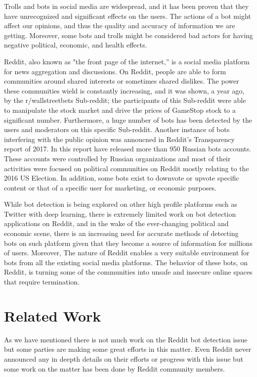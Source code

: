 \documentclass{article}
\begin{document}
Trolls and bots in social media are widespread, and it has been proven that they have unrecognized and significant effects on the users. The actions of a bot might affect our opinions, and thus the quality and accuracy of information we are getting. Moreover, some bots and trolls might be considered bad actors for having negative political, economic, and health effects. \par
Reddit, also known as "the front page of the internet,” is a social media platform for news aggregation and discussions. On Reddit, people are able to form communities around shared interests or sometimes shared dislikes. The power these communities wield is constantly increasing, and it was shown, a year ago, by the r/wallstreetbets Sub-reddit; the participants of this Sub-reddit were able to manipulate the stock market and drive the prices of GameStop stock to a significant number.  Furthermore,  a huge number of bots has been detected by the users and moderators on this specific Sub-reddit. Another instance of bots interfering with the public opinion was annoucned in Reddit's Transparency report of 2017.  In this report have released more than 950 Russian bots accounts. These accounts were controlled by Russian organizations and most of their activities were focused on political communities on Reddit mostly relating to the 2016 US Election. In addition, some bots exist to downvote or upvote specific content or that of a specific user for marketing, or economic purposes. \par
While bot detection is being explored on other high profile platforms such as Twitter with deep learning, there is extremely limited work on bot detection applications on Reddit, and in the wake of the ever-changing political and economic scene, there is an increasing need for accurate methods of detecting bots on such platform given that they become a source of information for millions of users. Moreover, The nature of Reddit enables a very suitable environment for bots from all the existing social media platforms. The behavior of these bots, on Reddit, is turning some of the communities into unsafe and insecure online spaces that require termination.

\section{Related Work}

    As we have mentioned there is not much work on the Reddit bot detection issue but some parties are making some great efforts in this matter. Even Reddit never announced any in deepth details on their efforts or progress with this issue but some work on the matter has been done by Reddit community members.\par
    
\end{document}
